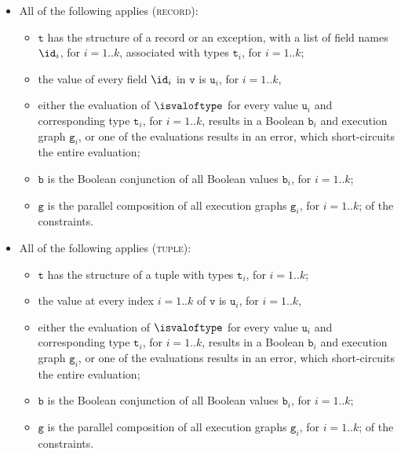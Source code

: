 \documentclass{book}
\newcommand\vg[0]{\texttt{g}}
\newcommand\vv[0]{\texttt{v}}
\newcommand\vt[0]{\texttt{t}}
\newcommand\vu[0]{\texttt{u}}
\newcommand\vb[0]{\texttt{b}}
\begin{document}
\begin{itemize}
  \item All of the following applies (\textsc{record}):
  \begin{itemize}
    \item $\vt$ has the structure of a record or an exception, with a list of field names
    $\id_i$, for $i=1..k$, associated with types $\vt_i$, for $i=1..k$;
    \item the value of every field $\id_i$ in $\vv$ is $\vu_i$, for $i=1..k$,
    \item either the evaluation of $\isvaloftype$ for every value $\vu_i$
    and corresponding type $\vt_i$, for $i=1..k$,
    results in a Boolean $\vb_i$ and execution graph $\vg_i$,
    or one of the evaluations results in an error,
    which short-circuits the entire evaluation;
    \item $\vb$ is the Boolean conjunction of all Boolean values $\vb_i$, for $i=1..k$;
    \item $\vg$ is the parallel composition of all execution graphs $\vg_i$, for $i=1..k$;
    of the constraints.
  \end{itemize}

  \item All of the following applies (\textsc{tuple}):
  \begin{itemize}
    \item $\vt$ has the structure of a tuple with types $\vt_i$, for $i=1..k$;
    \item the value at every index $i=1..k$ of $\vv$ is $\vu_i$, for $i=1..k$,
    \item either the evaluation of $\isvaloftype$ for every value $\vu_i$
    and corresponding type $\vt_i$, for $i=1..k$,
    results in a Boolean $\vb_i$ and execution graph $\vg_i$,
    or one of the evaluations results in an error,
    which short-circuits the entire evaluation;
    \item $\vb$ is the Boolean conjunction of all Boolean values $\vb_i$, for $i=1..k$;
    \item $\vg$ is the parallel composition of all execution graphs $\vg_i$, for $i=1..k$;
    of the constraints.
  \end{itemize}


\end{itemize}
\end{document}
